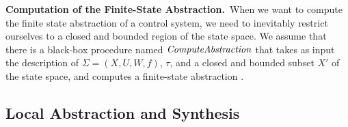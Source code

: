 \smallskip
\noindent\textbf{Computation of the Finite-State Abstraction.}\
When we want to compute the finite state abstraction of a control system, we need to inevitably restrict ourselves to a closed and bounded region of the state space.
We assume that there is a black-box procedure named $\mathit{ComputeAbstraction}$ that takes as input the description of $\Sigma = (X,U,W,f)$, $\tau$, and a closed and bounded subset $X'$ of the state space, and computes a finite-state abstraction .

\subsection{Local Abstraction and Synthesis}